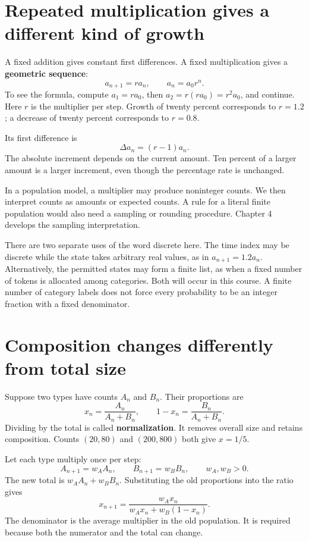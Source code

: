 \documentclass[11pt,oneside,openany]{book}
\theoremstyle{definition}
\theoremstyle{remark}
\numberwithin{equation}{chapter}
\begin{document}
\section{Repeated multiplication gives a different kind of growth}\label{ch01-repeated-multiplication-gives-a-different-kind-of-growth}

A fixed addition gives constant first differences. A fixed multiplication gives a \textbf{geometric sequence}: \[a_{n+1}=r a_n,\qquad a_n=a_0r^n.\] To see the formula, compute \(a_1=ra_0\), then \(a_2=r(ra_0)=r^2a_0\), and continue. Here \(r\) is the multiplier per step. Growth of twenty percent corresponds to \(r=1.2\); a decrease of twenty percent corresponds to \(r=0.8\).

Its first difference is \[\Delta a_n=(r-1)a_n.\] The absolute increment depends on the current amount. Ten percent of a larger amount is a larger increment, even though the percentage rate is unchanged.

In a population model, a multiplier may produce noninteger counts. We then interpret counts as amounts or expected counts. A rule for a literal finite population would also need a sampling or rounding procedure. Chapter 4 develops the sampling interpretation.

There are two separate uses of the word discrete here. The time index may be discrete while the state takes arbitrary real values, as in \(a_{n+1}=1.2a_n\). Alternatively, the permitted states may form a finite list, as when a fixed number of tokens is allocated among categories. Both will occur in this course. A finite number of category labels does not force every probability to be an integer fraction with a fixed denominator.

\section{Composition changes differently from total size}\label{ch01-composition-changes-differently-from-total-size}

Suppose two types have counts \(A_n\) and \(B_n\). Their proportions are \[x_n=\frac{A_n}{A_n+B_n},\qquad 1-x_n=\frac{B_n}{A_n+B_n}.\] Dividing by the total is called \textbf{normalization}. It removes overall size and retains composition. Counts \((20,80)\) and \((200,800)\) both give \(x=1/5\).

Let each type multiply once per step: \[A_{n+1}=w_AA_n,\qquad B_{n+1}=w_BB_n,\qquad w_A,w_B>0.\] The new total is \(w_AA_n+w_BB_n\). Substituting the old proportions into the ratio gives \[\boxed{x_{n+1}=\frac{w_Ax_n}{w_Ax_n+w_B(1-x_n)}.}\] The denominator is the average multiplier in the old population. It is required because both the numerator and the total can change.
\end{document}
